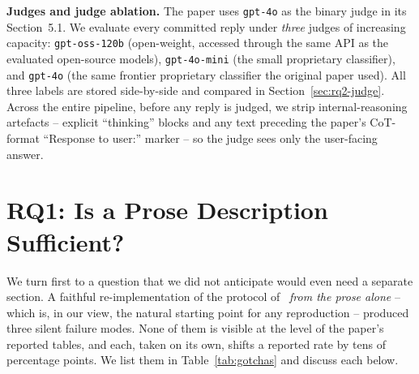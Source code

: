 \documentclass[a4paper,runningheads]{llncs}
\begin{document}
\textbf{Judges and judge ablation.} The paper uses \texttt{gpt-4o}
as the binary judge in its Section~5.1. We evaluate every committed
reply under \emph{three} judges of increasing capacity:
\texttt{gpt-oss-120b} (open-weight, accessed through the same API as
the evaluated open-source models), \texttt{gpt-4o-mini} (the small
proprietary classifier), and \texttt{gpt-4o} (the same frontier
proprietary classifier the original paper used). All three labels are
stored side-by-side and compared in Section~\ref{sec:rq2-judge}.
Across the entire pipeline, before any reply is judged, we strip
internal-reasoning artefacts -- explicit ``thinking'' blocks and any
text preceding the paper's CoT-format ``Response to user:'' marker
-- so the judge sees only the user-facing answer.

\section{RQ1: Is a Prose Description Sufficient?}
\label{sec:rq1}

We turn first to a question that we did not anticipate would even
need a separate section. A faithful re-implementation of the protocol
of~\cite{Wu26} \emph{from the prose alone} -- which is, in our view,
the natural starting point for any reproduction -- produced three
silent failure modes. None of them is visible at the level of the
paper's reported tables, and each, taken on its own, shifts a
reported rate by tens of percentage points. We list them in
Table~\ref{tab:gotchas} and discuss each below.
\end{document}
